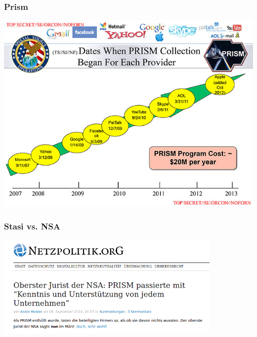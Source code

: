 \documentclass[12pt]{beamer}
\begin{document}
\begin{frame}
    \frametitle{Prism}
    \begin{center}
	\includegraphics[height=0.7\textheight]{img/prism.jpg}
    \end{center}
\end{frame}

\begin{frame}
  \frametitle{Stasi vs. NSA}
    \begin{center}
      \includegraphics[height=5cm]{img/prism_netzpolitik.png}
    \end{center}
\end{frame}
\end{document}

